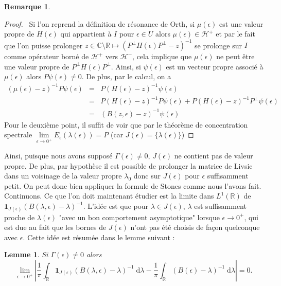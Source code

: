 \documentclass[12pt,openany,a4paper, titlepage]{article}
\newcommand{\f}[2]{\frac{#1}{#2}}
\newcommand{\lp}{\left(}
\newcommand{\rp}{\right)}
\newcommand{\dd}{\;\mathrm{d}}
\newcommand{\R}{\mathbb{R}}
\newcommand{\C}{\mathbb{C}}
\newtheorem{lem}{Lemme}
\theoremstyle{definition}
\theoremstyle{definition}
\theoremstyle{definition}
\theoremstyle{definition}
\theoremstyle{definition}
\newtheorem{rem}{Remarque}
\theoremstyle{definition}
\begin{document}
\begin{rem}
\begin{proof}
\,
Si l'on reprend la définition de résonance de Orth, si 
$\mu(\epsilon)$ est une valeur propre de $H(\epsilon)$ qui appartient à $I$ pour $\epsilon \in U$ alors $\mu(\epsilon)\in \mathcal{H}^+$ et par le fait que l'on puisse prolonger $z\in\C\setminus\R \mapsto \lp P^\perp H(\epsilon)P^\perp - z\rp^{-1}$ se prolonge sur $I$ comme opérateur borné de $\mathcal{H}^+$ vers $\mathcal{H}^-$, cela implique que $\mu(\epsilon)$ ne peut être une valeur propre  de $P^\perp H(\epsilon)P^\perp$. Ainsi, si $\psi(\epsilon)$ est un vecteur propre associé à $\mu(\epsilon)$ alors $P\psi(\epsilon) \neq 0$. De plus, par le calcul, on a 
        \begin{eqnarray*}
             (\mu(\epsilon) - z)^{-1}P\psi(\epsilon) &=& P(H(\epsilon) - z)^{-1}\psi(\epsilon) \\
             &=& P(H(\epsilon) - z)^{-1}P\psi(\epsilon) + P(H(\epsilon) - z)^{-1}P^\perp\psi(\epsilon) \\
             &=& (B(z,\epsilon) - z)^{-1}\psi(\epsilon)  
         \end{eqnarray*}
Pour le deuxième point, il suffit de voir que par le théorème de concentration spectrale $\lim\limits_{\epsilon \rightarrow 0^+} E_{\epsilon}(\lambda(\epsilon)) = P$ (car $J(\epsilon) = \{\lambda(\epsilon)\}$)
\end{proof}

Ainsi, puisque nous avons supposé $\Gamma(\epsilon)\neq 0$, $J(\epsilon)$ ne contient pas de valeur propre. De plus, par hypothèse il est possible de prolonger la matrice de Livsic dans un voisinage de la valeur propre $\lambda_0$ donc sur $J(\epsilon)$ pour $\epsilon$ suffisamment petit. On peut donc bien appliquer la formule de Stones comme nous l'avons fait. Continuons. Ce que l'on doit maintenant étudier est la limite dans $L^1(\R)$ de $\mathbf{1}_{J(\epsilon)}\lp B(\lambda,\epsilon) - \lambda \rp^{-1}$. L'idée est que pour $\lambda\in J(\epsilon)$, $\lambda$ est suffisamment proche de $\lambda(\epsilon)$ "avec un bon comportement asymptotique" lorsque $\epsilon \rightarrow 0^+$, qui est due au fait que les bornes de $J(\epsilon)$ n'ont pas été choisis de façon quelconque avec $\epsilon$. Cette idée est résumée dans le lemme suivant :

\begin{lem}\label{L1conver}
    Si $\Gamma(\epsilon) \neq 0$ alors 
    \begin{equation}
            \lim\limits_{\epsilon \rightarrow 0^+} \left| \f{1}{\pi} \int_\R \mathbf{1}_{J(\epsilon)}\lp  B(\lambda,\epsilon) - \lambda \rp^{-1} \dd \lambda - \f{1}{\pi} \int_\R \lp B(\epsilon) - \lambda \rp^{-1} \dd \lambda \right|= 0.
    \end{equation}
\end{lem}



\end{rem}
\end{document}
